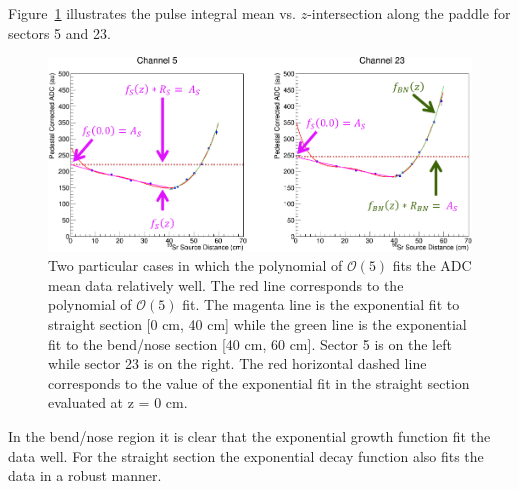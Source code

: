 Figure~\ref{fig:attfits} illustrates the pulse integral mean vs. $z$-intersection along the paddle for sectors 5 and 23.  
\begin{figure}[!htb]
	\centering
	\includegraphics[width=1.0\columnwidth]{calibration/figs/attn_fits}
	\caption{Two particular cases in which the polynomial of $\mathcal{O}(5)$ fits the ADC mean data relatively well.  The red line corresponds to the polynomial of $\mathcal{O}(5)$ fit.  The magenta line is the exponential fit to straight section [0 cm, 40 cm] while the green line is the exponential fit to the bend/nose section [40 cm, 60 cm].  Sector 5 is on the left while sector 23 is on the right.  The red horizontal dashed line corresponds to the value of the exponential fit in the straight section evaluated at z = 0 cm.}
	\label{fig:attfits}
\end{figure}
In the bend/nose region it is clear that the exponential growth function fit the data well.  For the straight section the exponential decay function also fits the data in a robust manner.  


